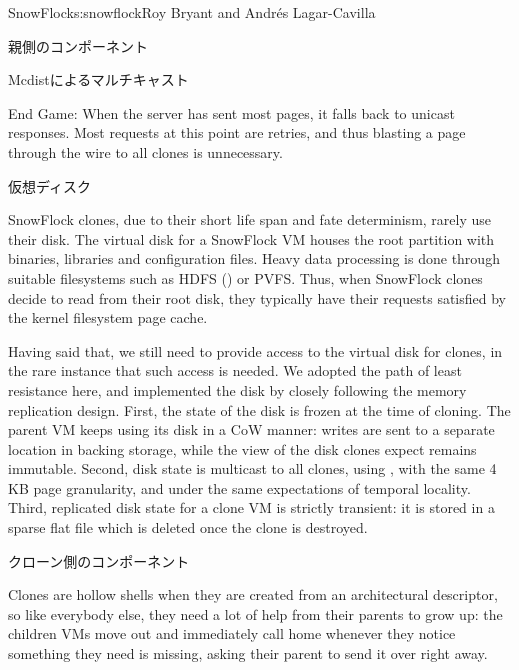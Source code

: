 \begin{aosachapter}{SnowFlock}{s:snowflock}{Roy Bryant and Andr\'e{s} Lagar-Cavilla}
\begin{aosasect1}{親側のコンポーネント}
\begin{aosasect2}{Mcdistによるマルチキャスト}
\begin{aosaitemize}
  \item End Game: When the server has sent most pages, it falls back
    to unicast responses. Most requests at this point are retries, and
    thus blasting a page through the wire to all clones is
    unnecessary.

\end{aosaitemize}

\end{aosasect2}

\begin{aosasect2}{仮想ディスク}

SnowFlock clones, due to their short life span and fate determinism,
rarely use their disk. The virtual disk for a SnowFlock VM houses the
root partition with binaries, libraries and configuration files. Heavy
data processing is done through suitable filesystems such as HDFS
() or PVFS\@. Thus, when SnowFlock clones decide
to read from their root disk, they typically have their requests
satisfied by the kernel filesystem page cache.

Having said that, we still need to provide access to the virtual disk
for clones, in the rare instance that such access is needed. We
adopted the path of least resistance here, and implemented the disk by
closely following the memory replication design. First, the state of
the disk is frozen at the time of cloning. The parent VM keeps using
its disk in a CoW manner: writes are sent to a separate location in
backing storage, while the view of the disk clones expect remains
immutable.  Second, disk state is multicast to all clones, using
, with the same 4 KB page granularity, and under the same
expectations of temporal locality. Third, replicated disk state for a
clone VM is strictly transient: it is stored in a sparse flat file
which is deleted once the clone is destroyed.

\end{aosasect2}

\end{aosasect1}

\begin{aosasect1}{クローン側のコンポーネント}

Clones are hollow shells when they are created from an architectural
descriptor, so like everybody else, they need a lot of help from their
parents to grow up: the children VMs move out and immediately call
home whenever they notice something they need is missing, asking their
parent to send it over right away.


\end{aosasect1}
\end{aosachapter}
